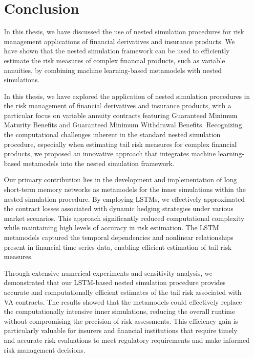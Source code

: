 \chapter{Conclusion} \label{chap:conclusion}

In this thesis, we have discussed the use of nested simulation procedures for risk management applications of financial derivatives and insurance products.
We have shown that the nested simulation framework can be used to efficiently estimate the risk measures of complex financial products, such as variable annuities, by combining machine learning-based metamodels with nested simulations.

In this thesis, we have explored the application of nested simulation procedures in the risk management of financial derivatives and insurance products, with a particular focus on variable annuity contracts featuring Guaranteed Minimum Maturity Benefits and Guaranteed Minimum Withdrawal Benefits. 
Recognizing the computational challenges inherent in the standard nested simulation procedure, especially when estimating tail risk measures for complex financial products, we proposed an innovative approach that integrates machine learning-based metamodels into the nested simulation framework.

Our primary contribution lies in the development and implementation of long short-term memory networks as metamodels for the inner simulations within the nested simulation procedure. 
By employing LSTMs, we effectively approximated the contract losses associated with dynamic hedging strategies under various market scenarios. This approach significantly reduced computational complexity while maintaining high levels of accuracy in risk estimation. 
The LSTM metamodels captured the temporal dependencies and nonlinear relationships present in financial time series data, enabling efficient estimation of tail risk measures.

Through extensive numerical experiments and sensitivity analysis, we demonstrated that our LSTM-based nested simulation procedure provides accurate and computationally efficient estimates of the tail risk associated with VA contracts. 
The results showed that the metamodels could effectively replace the computationally intensive inner simulations, reducing the overall runtime without compromising the precision of risk assessments.
This efficiency gain is particularly valuable for insurers and financial institutions that require timely and accurate risk evaluations to meet regulatory requirements and make informed risk management decisions.

